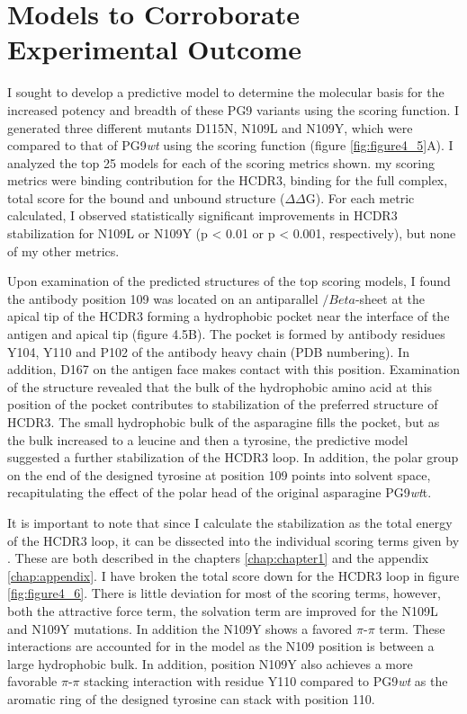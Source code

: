 \section{Models to Corroborate Experimental Outcome}
I sought to develop a predictive model to determine the molecular basis for the increased potency and breadth of these PG9 variants using the \rosetta scoring function. I generated three different mutants D115N, N109L and N109Y, which were compared to that of PG9\textit{wt} using the \rosetta scoring function (figure \ref{fig:figure4_5}A). I analyzed the top 25 models for each of the scoring metrics shown. my scoring metrics were binding contribution for the HCDR3, binding for the full complex, total score for the bound and unbound structure ($\Delta\Delta$G). For each metric calculated, I observed statistically significant improvements in HCDR3 stabilization for N109L or N109Y (p < 0.01 or p < 0.001, respectively), but none of my other metrics.

Upon examination of the predicted structures of the top scoring models, I found the antibody position 109 was located on an antiparallel $/Beta$-sheet at the apical tip of the HCDR3 forming a hydrophobic pocket near the interface of the antigen and apical tip (figure 4.5B). The pocket is formed by antibody residues Y104, Y110 and P102 of the antibody heavy chain (PDB numbering). In addition, D167 on the antigen face makes contact with this position. Examination of the structure revealed that the bulk of the hydrophobic amino acid at this position of the pocket contributes to stabilization of the preferred structure of HCDR3. The small hydrophobic bulk of the asparagine fills the pocket, but as the bulk increased to a leucine and then a tyrosine, the predictive model suggested a further stabilization of the HCDR3 loop. In addition, the polar group on the end of the designed tyrosine at position 109 points into solvent space, recapitulating the effect of the polar head of the original asparagine PG9\textit{wt}t.

It is important to note that since I calculate the stabilization as the total energy of the HCDR3 loop, it can be dissected into the individual scoring terms given by \rosetta. These are both described in the chapters \ref{chap:chapter1} and the appendix \ref{chap:appendix}. I have broken the total score down for the HCDR3 loop in figure \ref{fig:figure4_6}. There is little deviation for most of the scoring terms, however, both the attractive force term, the solvation term are improved for the N109L and N109Y mutations. In addition the N109Y shows a favored $\pi$-$\pi$ term. These interactions are accounted for in the model as the N109 position is between a large hydrophobic bulk. In addition, position N109Y also achieves a more favorable $\pi$-$\pi$ stacking interaction with residue Y110 compared to PG9\textit{wt} as the aromatic ring of the designed tyrosine can stack with position 110.

